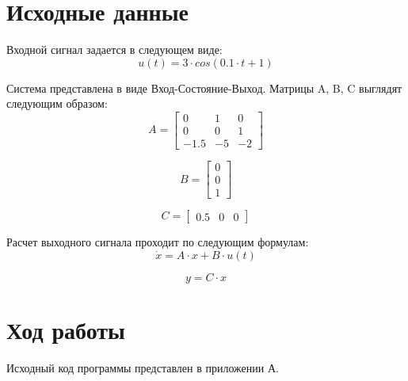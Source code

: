 \documentclass[14pt,a4paper]{extreport}
\begin{document}
\newpage
\chapter*{Исходные данные}

Входной сигнал задается в следующем виде:
\begin{equation}
    u(t) = 3 \cdot  cos(0.1 \cdot t + 1)
\end{equation}

Система представлена в виде Вход-Состояние-Выход. Матрицы A, B, C выглядят следующим образом:
\begin{equation}
    A = 
    \begin{bmatrix} 
        0 & 1 & 0 \\ 
        0 & 0 & 1 \\
        -1.5 & -5 & -2
    \end{bmatrix}
\end{equation}

\begin{equation}
    B = 
    \begin{bmatrix} 
        0 \\ 
        0 \\
        1
    \end{bmatrix}
\end{equation}

\begin{equation}
    C = 
    \begin{bmatrix} 
        0.5 & 0 & 0
    \end{bmatrix}
\end{equation}

Расчет выходного сигнала проходит по следующим формулам:
\begin{equation}
\dot x = A \cdot x + B \cdot u(t)
\end{equation}

\begin{equation}
y = C \cdot x
\end{equation}

\chapter*{Ход работы}
Исходный код программы представлен в приложении А. 
\end{document}
